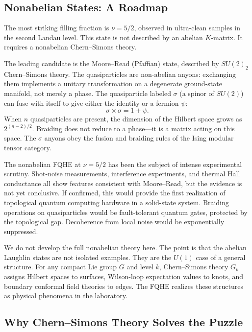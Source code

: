 \subsection{Nonabelian States: A Roadmap}
\label{subsec:fqhe-nonabelian}

The most striking filling fraction is $\nu=5/2$, observed in ultra-clean samples in the second Landau level. This state is not described by an abelian $K$-matrix. It requires a nonabelian Chern--Simons theory.

The leading candidate is the Moore--Read (Pfaffian) state, described by $SU(2)_2$ Chern--Simons theory. The quasiparticles are non-abelian anyons: exchanging them implements a unitary transformation on a degenerate ground-state manifold, not merely a phase. The quasiparticle labeled $\sigma$ (a spinor of $SU(2)$) can fuse with itself to give either the identity or a fermion $\psi$:
\begin{equation}
  \sigma\times\sigma = 1 + \psi.
  \label{eq:fqhe-moore-read-fusion}
\end{equation}
When $n$ quasiparticles are present, the dimension of the Hilbert space grows as $2^{(n-2)/2}$. Braiding does not reduce to a phase---it is a matrix acting on this space. The $\sigma$ anyons obey the fusion and braiding rules of the Ising modular tensor category.

The nonabelian FQHE at $\nu=5/2$ has been the subject of intense experimental scrutiny. Shot-noise measurements, interference experiments, and thermal Hall conductance all show features consistent with Moore--Read, but the evidence is not yet conclusive. If confirmed, this would provide the first realization of topological quantum computing hardware in a solid-state system. Braiding operations on quasiparticles would be fault-tolerant quantum gates, protected by the topological gap. Decoherence from local noise would be exponentially suppressed.

We do not develop the full nonabelian theory here. The point is that the abelian Laughlin states are not isolated examples. They are the $U(1)$ case of a general structure. For any compact Lie group $G$ and level $k$, Chern--Simons theory $G_k$ assigns Hilbert spaces to surfaces, Wilson-loop expectation values to knots, and boundary conformal field theories to edges. The FQHE realizes these structures as physical phenomena in the laboratory.

\subsection{Why Chern--Simons Theory Solves the Puzzle}
\label{subsec:fqhe-summary}

